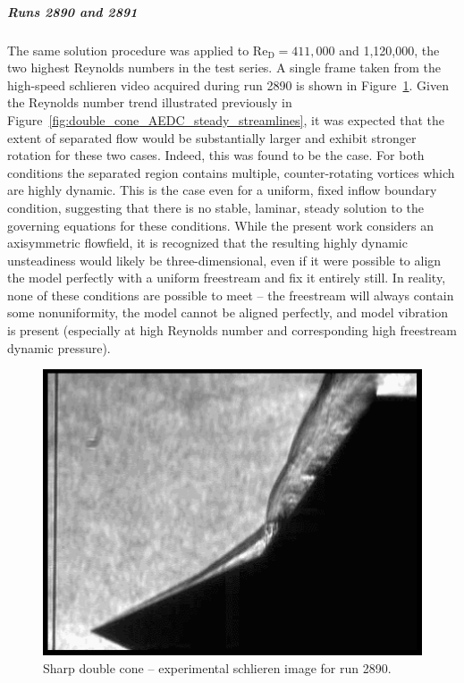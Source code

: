 \clearpage
\subparagraph{Runs 2890 and 2891} 
The same solution procedure was applied to Re$_\text{D}=411,000$ and 1,120,000, the two highest Reynolds numbers in the test series.  A single frame taken from the high-speed schlieren video acquired during run 2890 is shown in Figure~\ref{fig:double_cone_exp_schlieren}.
Given the Reynolds number trend illustrated previously in Figure~\ref{fig:double_cone_AEDC_steady_streamlines}, it was expected that the extent of separated flow would be substantially larger and exhibit stronger rotation for these two cases.  Indeed, this was found to be the case.  For both conditions the separated region contains multiple, counter-rotating vortices which are highly dynamic.  This is the case even for a uniform, fixed inflow boundary condition, suggesting that there is no stable, laminar, steady solution to the governing equations for these conditions.  While the present work considers an axisymmetric flowfield, it is recognized that the resulting highly dynamic unsteadiness would likely be three-dimensional, even if it were possible to align the model perfectly with a uniform freestream and fix it entirely still. In reality, none of these conditions are possible to meet -- the freestream will always contain some nonuniformity, the model cannot be aligned perfectly, and model vibration is present (especially at high Reynolds number and corresponding high freestream dynamic pressure).       
\begin{figure}[hbtp]
  \begin{center}
    \includegraphics[width=\textwidth]{figures/aedc_double_cone/exp_schlieren_2892}
    \caption{Sharp double cone -- experimental schlieren image for run 2890.\label{fig:double_cone_exp_schlieren}}
  \end{center}
\end{figure}


